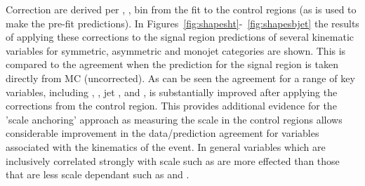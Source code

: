 Correction are derived per \scalht, \njet, \nb bin from the fit to the control regions (as 
is used to make the pre-fit predictions). In Figures~\ref{fig:shapesht}-~\ref{fig:shapesbjet} the results of applying 
these corrections to the signal region predictions of several kinematic variables 
for symmetric, asymmetric and monojet categories are shown. 
This is compared to the agreement when the prediction for the signal region
is taken directly from MC (uncorrected). As can be seen the agreement for a range of key variables,
including \scalht, \mht, jet \pt, \njet and \nb, is substantially improved after applying 
the corrections from the control region. This provides additional evidence for the 'scale anchoring'
approach as measuring the scale in the control regions allows considerable improvement
in the data/prediction agreement for variables associated with the kinematics of the event.
In general variables which are inclusively correlated strongly with scale such as \mht are more
effected than those that are less scale dependant such as \alphat and \bdphi.

